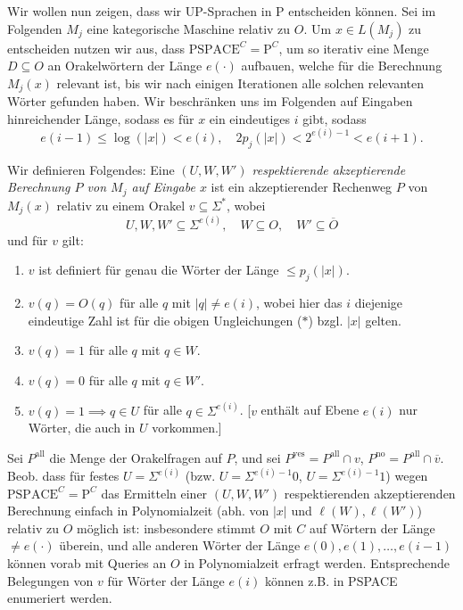 \documentclass[nofonts]{uebung}
\def\P{\ensuremath{\mathrm{P}}}
\begin{document}
Wir wollen nun zeigen, dass wir UP-Sprachen in P entscheiden können. Sei im Folgenden $M_j$ eine kategorische Maschine relativ zu $O$. Um $x\in L(M_j)$ zu entscheiden nutzen wir aus, dass $\mathrm{PSPACE}^C=\P^C$, um so iterativ eine Menge $D\subseteq O$ an Orakelwörtern der Länge $e(\cdot)$ aufbauen, welche für die Berechnung $M_j(x)$ relevant ist, bis wir nach einigen Iterationen alle solchen relevanten Wörter gefunden haben. 
Wir beschränken uns im Folgenden auf Eingaben hinreichender Länge, sodass es für $x$ ein eindeutiges $i$ gibt, sodass
\[ e(i-1) \leq \log(|x|) < e(i), \quad 2p_j(|x|)< 2^{e(i)-1} < e(i+1).\tag{\ast} \]

Wir definieren Folgendes: %
Eine \emph{$(U, W, W')$ respektierende akzeptierende Berechnung $P$ von $M_j$ auf Eingabe $x$} ist ein akzeptierender Rechenweg $P$ von $M_j(x)$ relativ zu einem Orakel $v\subseteq\Sigma^*$, wobei 
\[ U, W,W'\subseteq \Sigma^{e(i)}, \quad W\subseteq O, \quad W'\subseteq\overline{O} \]
und für $v$ gilt:
\begin{enumerate}[noitemsep,label=\arabic*.]
    \item $v$ ist definiert für genau die Wörter der Länge $\leq p_j(|x|)$.
    \item $v(q)=O(q)$ für alle $q$ mit $|q|\neq  e(i)$, wobei hier das $i$ diejenige eindeutige Zahl ist für die obigen Ungleichungen ($\ast$) bzgl. $|x|$ gelten.
    \item $v(q)=1$ für alle $q$ mit $q\in W$.
    \item $v(q)=0$ für alle $q$ mit $q\in W'$.
    \item $v(q)=1 \implies q\in U$ für alle $q\in\Sigma^{e(i)}$. [$v$ enthält auf Ebene $e(i)$ nur Wörter, die auch in $U$ vorkommen.]
\end{enumerate}

Sei $P^\mathrm{all}$ die Menge der Orakelfragen auf $P$, und sei $P^\mathrm{yes}=P^\mathrm{all}\cap v$, $P^\mathrm{no}=P^\mathrm{all}\cap \overline{v}$.
Beob. dass für festes $U=\Sigma^{e(i)}$ (bzw. $U=\Sigma^{e(i)-1}0$, $U=\Sigma^{e(i)-1}1$) wegen $\mathrm{PSPACE}^C=\P^C$ das Ermitteln einer $(U, W, W')$ respektierenden akzeptierenden Berechnung einfach in Polynomialzeit (abh. von $|x|$ und $\ell(W),\ell(W')$) relativ zu $O$ möglich ist: insbesondere stimmt $O$ mit $C$ auf Wörtern der Länge $\neq e(\cdot)$ überein, und alle anderen Wörter der Länge $e(0), e(1), \dots, e(i-1)$ können vorab mit Queries an $O$ in Polynomialzeit erfragt werden.
Entsprechende Belegungen von $v$ für Wörter der Länge $e(i)$ können z.B. in PSPACE enumeriert werden.
\end{document}
